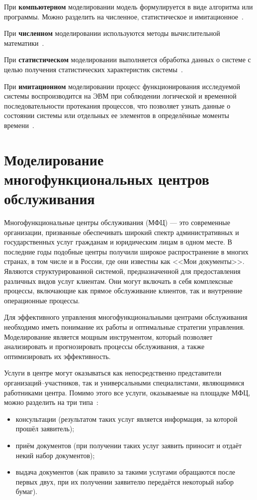 При \textbf{компьютерном} моделировании модель формулируется в виде алгоритма или программы. Можно разделить на численное, статистическое и имитационное~\cite{m_types}.

При \textbf{численном} моделировании используются методы вычислительной математики~\cite{m_types}.

При \textbf{статистическом} моделировании выполняется обработка данных о системе с целью получения статистических характеристик системы~\cite{m_types}.

При \textbf{имитационном} моделировании процесс функционирования исследуемой системы воспроизводится на ЭВМ при соблюдении логической и временной последовательности протекания процессов, что позволяет узнать данные о состоянии системы или отдельных ее элементов в определённые моменты времени~\cite{m_types}.

\section{Моделирование многофункциональных центров обслуживания}

Многофункциональные центры обслуживания (МФЦ) --- это современные организации, призванные обеспечивать широкий спектр административных и государственных услуг гражданам и юридическим лицам в одном месте. В последние годы подобные центры получили широкое распространение в многих странах, в том числе и в России, где они известны как <<Мои документы>>. Являются структурированной системой, предназначенной для предоставления различных видов услуг клиентам. Они могут включать в себя комплексные процессы, включающие как прямое обслуживание клиентов, так и внутренние операционные процессы.

Для эффективного управления многофункциональными центрами обслуживания необходимо иметь понимание их работы и оптимальные стратегии управления. Моделирование является мощным инструментом, который позволяет анализировать и прогнозировать процессы обслуживания, а также оптимизировать их эффективность.

Услуги в центре могут оказываться как непосредственно представители организаций--участников, так и универсальными специалистами, являющимися работниками центра. Помимо этого все услуги, оказываемые на площадке МФЦ, можно разделить на три типа~\cite{serv_types}:
\begin{itemize}[label=---]
	\item консультации (результатом таких услуг является информация, за которой прошёл заявитель);
	\item приём документов (при получении таких услуг заявить приносит и отдаёт некий набор документов);
	\item выдача документов (как правило за такими услугами обращаются после первых двух, при их получении заявителю передаётся некоторый набор бумаг).
\end{itemize}


